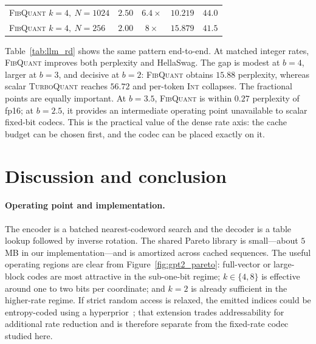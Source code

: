 \documentclass{article}
\theoremstyle{definition}
\theoremstyle{remark}
\begin{document}
\begin{table}[h]
\begin{center}
\begin{tabular}{l c c c c}
\textsc{FibQuant} $k{=}4,\ N{=}1024$ & $2.50$ & $6.4\times$& $\mathbf{10.219}$ & $\mathbf{44.0}$ \\
\textsc{FibQuant} $k{=}4,\ N{=}256$  & $2.00$ & $8\times$  & $\mathbf{15.879}$ & $\mathbf{41.5}$ \\
\bottomrule
\end{tabular}

\end{center}
\end{table}

Table~\ref{tab:llm_rd} shows the same pattern end-to-end.  At
matched integer rates, \textsc{FibQuant} improves both perplexity
and HellaSwag.  The gap is modest at $b = 4$, larger at $b = 3$, and
decisive at $b = 2$: \textsc{FibQuant} obtains $15.88$ perplexity,
whereas scalar \textsc{TurboQuant} reaches $56.72$ and per-token
\textsc{Int} collapses.  The fractional points are equally
important.  At $b = 3.5$, \textsc{FibQuant} is within $0.27$
perplexity of fp16; at $b = 2.5$, it provides an intermediate
operating point unavailable to scalar fixed-bit codecs.  This is
the practical value of the dense rate axis: the cache budget can be
chosen first, and the codec can be placed exactly on it.

\section{Discussion and conclusion}
\label{sec:disc}

\paragraph{Operating point and implementation.}
The encoder is a batched nearest-codeword search and the decoder is
a table lookup followed by inverse rotation.  The shared Pareto
library is small---about $5$\,MB in our implementation---and is
amortized across cached sequences.  The useful operating regions
are clear from Figure~\ref{fig:gpt2_pareto}: full-vector or
large-block codes are most attractive in the sub-one-bit regime;
$k \in \{4, 8\}$ is effective around one to two bits per
coordinate; and $k = 2$ is already sufficient in the higher-rate
regime.  If strict random access is relaxed, the emitted indices
could be entropy-coded using a
hyperprior~\citep{balle2018hyperprior}; that extension trades
addressability for additional rate reduction and is therefore
separate from the fixed-rate codec studied here.
\end{document}
